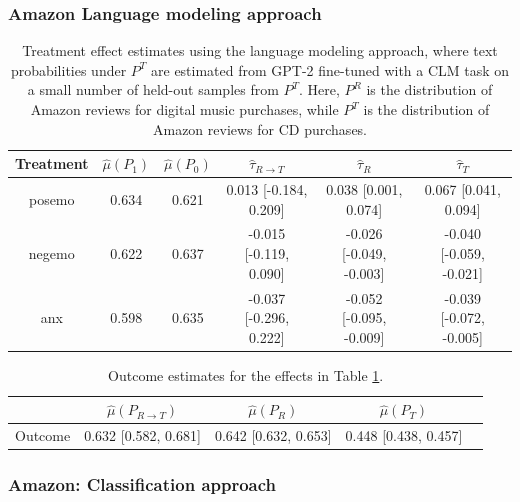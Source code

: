 \documentclass{article}
\begin{document}
\subsubsection{Amazon \cite{przyant2021causal} Language modeling approach}

\begin{table}[!ht]
    \centering
    \begin{tabular}{c|ccccc}
    \toprule
    Treatment   &   $\hat{\mu}(P_1)$ &   $\hat{\mu}(P_0)$ & $\hat{\tau}_{R \rightarrow T}$   & $\hat{\tau}_R$          & $\hat{\tau}_T$          \\
    \midrule
    posemo      &              0.634 &              0.621 & 0.013 [-0.184, 0.209]            & 0.038 [0.001, 0.074]    & 0.067 [0.041, 0.094]    \\
    negemo      &              0.622 &              0.637 & -0.015 [-0.119, 0.090]           & -0.026 [-0.049, -0.003] & -0.040 [-0.059, -0.021] \\
    anx         &              0.598 &              0.635 & -0.037 [-0.296, 0.222]           & -0.052 [-0.095, -0.009] & -0.039 [-0.072, -0.005] \\
    \bottomrule
    \end{tabular}
    \caption{Treatment effect estimates using the language modeling approach, where text probabilities under $P^T$ are estimated from GPT-2 fine-tuned with a CLM task on a small number of held-out samples from $P^T$. Here, $P^R$ is the distribution of Amazon reviews for digital music purchases, while $P^T$ is the distribution of Amazon reviews for CD purchases.}
    \label{tab:results_clm_gpt2_finetuned_amazon_pryzant}
\end{table}

\begin{table}[!ht]
    \centering
    \begin{tabular}{c|cccc}
    \toprule
    & $\hat{\mu}(P_{R \rightarrow T})$   & $\hat{\mu}(P_R)$     & $\hat{\mu}(P_T)$     \\
    \midrule
    Outcome & 0.632 [0.582, 0.681]               & 0.642 [0.632, 0.653] & 0.448 [0.438, 0.457] \\
    \bottomrule
    \end{tabular}
    \caption{Outcome estimates for the effects in Table \ref{tab:results_clm_gpt2_finetuned_amazon_pryzant}.}
    \label{tab:results_clm_gpt2_finetuned_amazon_pryzant_outcome}
\end{table}

\newpage
\subsubsection{Amazon: Classification approach}
\end{document}
